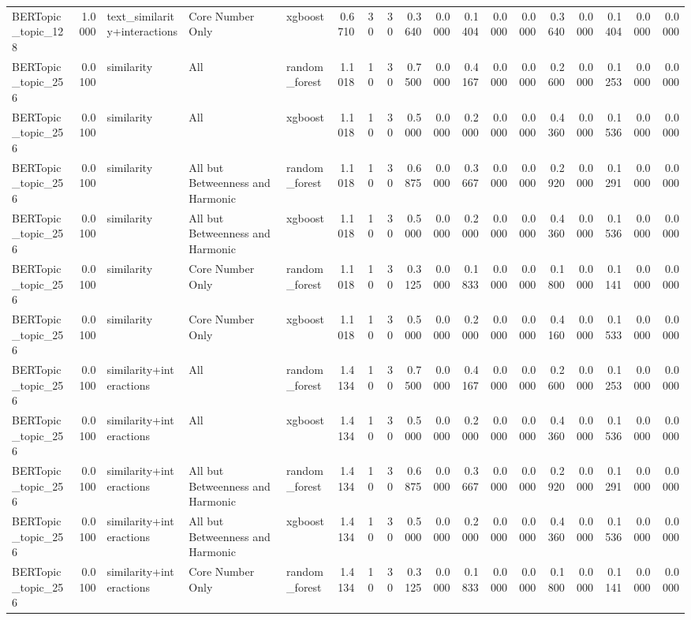 \begin{tabular}{lrlllrrrrrrrrrrrrr}
BERTopic_topic_128 & 1.0000 & text_similarity+interactions & Core Number Only & xgboost & 0.6710 & 30 & 30 & 0.3640 & 0.0000 & 0.1404 & 0.0000 & 0.0000 & 0.3640 & 0.0000 & 0.1404 & 0.0000 & 0.0000 \\
BERTopic_topic_256 & 0.0100 & similarity & All & random_forest & 1.1018 & 10 & 30 & 0.7500 & 0.0000 & 0.4167 & 0.0000 & 0.0000 & 0.2600 & 0.0000 & 0.1253 & 0.0000 & 0.0000 \\
BERTopic_topic_256 & 0.0100 & similarity & All & xgboost & 1.1018 & 10 & 30 & 0.5000 & 0.0000 & 0.2000 & 0.0000 & 0.0000 & 0.4360 & 0.0000 & 0.1536 & 0.0000 & 0.0000 \\
BERTopic_topic_256 & 0.0100 & similarity & All but Betweenness and Harmonic & random_forest & 1.1018 & 10 & 30 & 0.6875 & 0.0000 & 0.3667 & 0.0000 & 0.0000 & 0.2920 & 0.0000 & 0.1291 & 0.0000 & 0.0000 \\
BERTopic_topic_256 & 0.0100 & similarity & All but Betweenness and Harmonic & xgboost & 1.1018 & 10 & 30 & 0.5000 & 0.0000 & 0.2000 & 0.0000 & 0.0000 & 0.4360 & 0.0000 & 0.1536 & 0.0000 & 0.0000 \\
BERTopic_topic_256 & 0.0100 & similarity & Core Number Only & random_forest & 1.1018 & 10 & 30 & 0.3125 & 0.0000 & 0.1833 & 0.0000 & 0.0000 & 0.1800 & 0.0000 & 0.1141 & 0.0000 & 0.0000 \\
BERTopic_topic_256 & 0.0100 & similarity & Core Number Only & xgboost & 1.1018 & 10 & 30 & 0.5000 & 0.0000 & 0.2000 & 0.0000 & 0.0000 & 0.4160 & 0.0000 & 0.1533 & 0.0000 & 0.0000 \\
BERTopic_topic_256 & 0.0100 & similarity+interactions & All & random_forest & 1.4134 & 10 & 30 & 0.7500 & 0.0000 & 0.4167 & 0.0000 & 0.0000 & 0.2600 & 0.0000 & 0.1253 & 0.0000 & 0.0000 \\
BERTopic_topic_256 & 0.0100 & similarity+interactions & All & xgboost & 1.4134 & 10 & 30 & 0.5000 & 0.0000 & 0.2000 & 0.0000 & 0.0000 & 0.4360 & 0.0000 & 0.1536 & 0.0000 & 0.0000 \\
BERTopic_topic_256 & 0.0100 & similarity+interactions & All but Betweenness and Harmonic & random_forest & 1.4134 & 10 & 30 & 0.6875 & 0.0000 & 0.3667 & 0.0000 & 0.0000 & 0.2920 & 0.0000 & 0.1291 & 0.0000 & 0.0000 \\
BERTopic_topic_256 & 0.0100 & similarity+interactions & All but Betweenness and Harmonic & xgboost & 1.4134 & 10 & 30 & 0.5000 & 0.0000 & 0.2000 & 0.0000 & 0.0000 & 0.4360 & 0.0000 & 0.1536 & 0.0000 & 0.0000 \\
BERTopic_topic_256 & 0.0100 & similarity+interactions & Core Number Only & random_forest & 1.4134 & 10 & 30 & 0.3125 & 0.0000 & 0.1833 & 0.0000 & 0.0000 & 0.1800 & 0.0000 & 0.1141 & 0.0000 & 0.0000 \\

\end{tabular}
